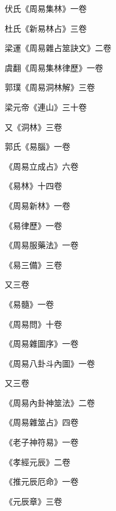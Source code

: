 \begin{pinyinscope}
 伏氏《周易集林》一卷



 杜氏《新易林占》三卷



 梁運《周易雜占筮訣文》二卷



 虞翻《周易集林律歷》一卷



 郭璞《周易洞林解》三卷



 梁元帝《連山》三十卷



 又《洞林》三卷



 郭氏《易腦》一卷



 《周易立成占》六卷



 《易林》十四卷



 《周易新林》一卷



 《易律歷》一卷



 《周易服藥法》一卷



 《易三備》三卷



 又三卷



 《易髓》一卷



 《周易問》十卷



 《周易雜圖序》一卷



 《周易八卦斗內圖》一卷



 又三卷



 《周易內卦神筮法》二卷



 《周易雜筮占》四卷



 《老子神符易》一卷



 《孝經元辰》二卷



 《推元辰厄命》一卷



 《元辰章》三卷




\end{pinyinscope}
